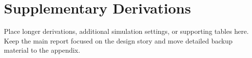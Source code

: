 \section{Supplementary Derivations}
\label{app:supplementary_derivations}

Place longer derivations, additional simulation settings, or supporting tables
here. Keep the main report focused on the design story and move detailed backup
material to the appendix.
